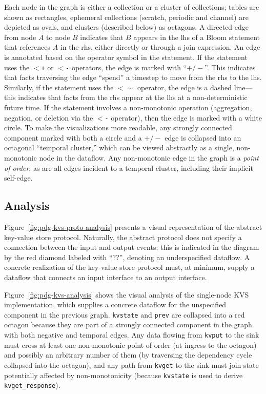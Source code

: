 Each node in the graph is either a collection or a cluster of collections;
tables are shown as rectangles, ephemeral collections (scratch, periodic and
channel) are depicted as ovals, and clusters (described below) as octagons. A
directed edge from node $A$ to node $B$ indicates that $B$ appears in the lhs of
a Bloom statement that references $A$ in the rhs, either directly or through a join
expression. An edge is annotated based on the operator symbol in the statement. If
the statement uses the \texttt{$<$+} or \texttt{$<$-} operators, the edge is marked
with ``$+/-$''. This indicates that facts traversing the edge ``spend'' a
timestep to move from the rhs to the lhs. Similarly, if the statement uses the
\texttt{$<\sim$} operator, the edge is a dashed line---this indicates that facts
from the rhs appear at the lhs at a non-deterministic future time. If the statement
involves a non-monotonic operation (aggregation, negation, or deletion via the \texttt{$<$-}
operator), then the edge is marked with a white circle.  To make the
visualizations more readable, any strongly connected component marked with both
a circle and a $+/-$ edge is collapsed into an octagonal ``temporal cluster,''
which can be viewed abstractly as a single, non-monotonic node in the
dataflow. Any non-monotonic edge in the graph is a \emph{point of order}, as are
all edges incident to a temporal cluster, including their implicit self-edge.

\subsection{Analysis}
Figure~\ref{fig:pdg-kvs-proto-analysis} presents a visual representation of the
abstract key-value store protocol. 
Naturally, the abstract protocol does not specify a
connection between the input and output events; this is indicated in the diagram
by the red diamond labeled with ``??'', denoting an underspecified dataflow. A
concrete realization of the key-value store protocol must, at minimum, supply a
dataflow that connects an input interface to an output interface.

Figure~\ref{fig:pdg-kvs-analysis} shows the visual analysis of the single-node
KVS implementation, which supplies a concrete dataflow for the unspecified
component in the previous graph.  \texttt{kvstate} and \texttt{prev} are
collapsed into a red octagon because they are part of a strongly connected
component in the graph with both negative and temporal edges.  Any data flowing
from \texttt{kvput} to the sink must cross at least one non-monotonic point of
order (at ingress to the octagon) and possibly an arbitrary number of them (by
traversing the dependency cycle collapsed into the octagon), and any path from
\texttt{kvget} to the sink must join state potentially affected by
non-monotonicity (because \texttt{kvstate} is used to derive
\texttt{kvget\_response}).

